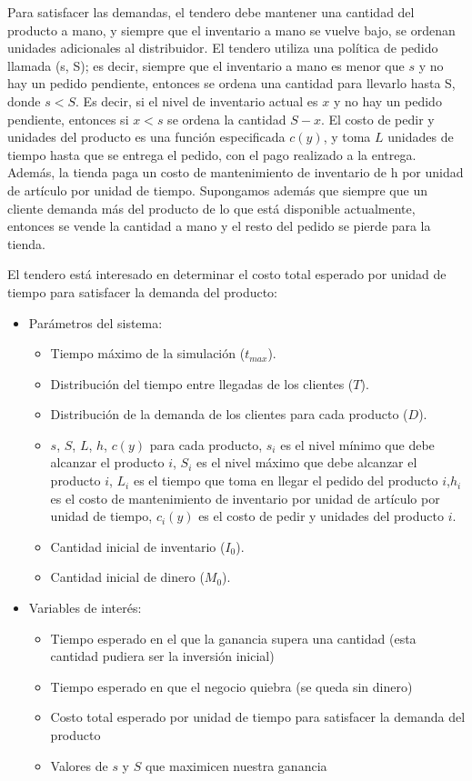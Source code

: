 \documentclass{article}
\begin{document}
Para satisfacer las demandas, el tendero debe mantener una cantidad del producto a mano, y siempre que el inventario a
mano se vuelve bajo, se ordenan unidades adicionales al distribuidor. El tendero utiliza una política de pedido
llamada (s, S); es decir, siempre que el inventario a mano es menor que $s$ y no hay un pedido pendiente, entonces se
ordena una cantidad para llevarlo hasta S, donde $s<S$. Es decir, si el nivel de inventario actual es $x$ y no hay un
pedido pendiente, entonces si $x<s$ se ordena la cantidad $S-x$.
El costo de pedir y unidades del producto es una función especificada $c(y)$, y toma $L$ unidades de tiempo hasta que se
entrega el pedido, con el pago realizado a la entrega. Además, la tienda paga un costo de mantenimiento de inventario de
h por unidad de artículo por unidad de tiempo.
Supongamos además que siempre que un cliente demanda más del producto de lo que está disponible actualmente, entonces se
vende la cantidad a mano y el resto del pedido se pierde para la tienda.

El tendero está interesado en determinar el costo total esperado por unidad de tiempo para satisfacer la demanda del
producto:


\begin{itemize}

    \item Parámetros del sistema:
    \begin{itemize}
        \item  Tiempo máximo de la simulación ($t_{max}$).
        \item  Distribución del tiempo entre llegadas de los clientes ($T$).
        \item  Distribución de la demanda de los clientes para cada producto ($D$).
        \item  $s$, $S$, $L$, $h$, $c(y)$ para cada producto, $s_i$ es el nivel mínimo que debe alcanzar el producto $i$, $S_i$ es el nivel máximo que debe alcanzar el producto $i$, $L_i$ es el tiempo que toma en llegar el pedido del producto $i$,$h_i$ es el costo de mantenimiento de inventario por unidad de artículo por unidad de tiempo, $c_i(y)$ es el costo de pedir y unidades del producto $i$.
        \item Cantidad inicial de inventario ($I_0$).
        \item Cantidad inicial de dinero ($M_0$).
     \end{itemize}


    \item Variables de interés:
    \begin{itemize}
        \item Tiempo esperado en el que la ganancia supera una cantidad (esta cantidad pudiera ser la inversión inicial)
        \item Tiempo esperado en que el negocio quiebra (se queda sin dinero)
        \item Costo total esperado por unidad de tiempo para satisfacer la demanda del producto
        \item Valores de $s$ y $S$ que maximicen nuestra ganancia
    \end{itemize}
\end{itemize}
\end{document}

